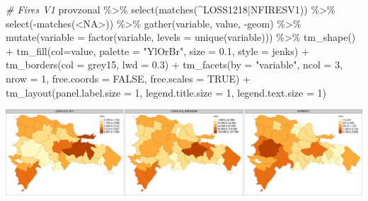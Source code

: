 \documentclass[10pt,landscape,a3paper]{article}
\newenvironment{Shaded}{\begin{snugshade}}{\end{snugshade}}
\newcommand{\AttributeTok}[1]{\textcolor[rgb]{0.77,0.63,0.00}{#1}}
\newcommand{\CommentTok}[1]{\textcolor[rgb]{0.56,0.35,0.01}{\textit{#1}}}
\newcommand{\ConstantTok}[1]{\textcolor[rgb]{0.00,0.00,0.00}{#1}}
\newcommand{\DecValTok}[1]{\textcolor[rgb]{0.00,0.00,0.81}{#1}}
\newcommand{\FloatTok}[1]{\textcolor[rgb]{0.00,0.00,0.81}{#1}}
\newcommand{\FunctionTok}[1]{\textcolor[rgb]{0.00,0.00,0.00}{#1}}
\newcommand{\NormalTok}[1]{#1}
\newcommand{\SpecialCharTok}[1]{\textcolor[rgb]{0.00,0.00,0.00}{#1}}
\newcommand{\StringTok}[1]{\textcolor[rgb]{0.31,0.60,0.02}{#1}}
\begin{document}
\begin{Shaded}
\begin{Highlighting}[]
\CommentTok{\# Fires V1}
\NormalTok{provzonal }\SpecialCharTok{\%\textgreater{}\%} \FunctionTok{select}\NormalTok{(}\FunctionTok{matches}\NormalTok{(}\StringTok{\textquotesingle{}\^{}LOSS1218|NFIRESV1\textquotesingle{}}\NormalTok{)) }\SpecialCharTok{\%\textgreater{}\%} \FunctionTok{select}\NormalTok{(}\SpecialCharTok{{-}}\FunctionTok{matches}\NormalTok{(}\StringTok{\textquotesingle{}\textless{}NA\textgreater{}\textquotesingle{}}\NormalTok{)) }\SpecialCharTok{\%\textgreater{}\%} 
  \FunctionTok{gather}\NormalTok{(variable, value, }\SpecialCharTok{{-}}\NormalTok{geom) }\SpecialCharTok{\%\textgreater{}\%}
  \FunctionTok{mutate}\NormalTok{(}\AttributeTok{variable =} \FunctionTok{factor}\NormalTok{(variable, }\AttributeTok{levels =} \FunctionTok{unique}\NormalTok{(variable))) }\SpecialCharTok{\%\textgreater{}\%} 
  \FunctionTok{tm\_shape}\NormalTok{() }\SpecialCharTok{+}
  \FunctionTok{tm\_fill}\NormalTok{(}\AttributeTok{col=}\StringTok{\textquotesingle{}value\textquotesingle{}}\NormalTok{, }\AttributeTok{palette =} \StringTok{"YlOrBr"}\NormalTok{, }\AttributeTok{size =} \FloatTok{0.1}\NormalTok{, }\AttributeTok{style =} \StringTok{\textquotesingle{}jenks\textquotesingle{}}\NormalTok{) }\SpecialCharTok{+}
  \FunctionTok{tm\_borders}\NormalTok{(}\AttributeTok{col =} \StringTok{\textquotesingle{}grey15\textquotesingle{}}\NormalTok{, }\AttributeTok{lwd =} \FloatTok{0.3}\NormalTok{) }\SpecialCharTok{+}
  \FunctionTok{tm\_facets}\NormalTok{(}\AttributeTok{by =} \StringTok{"variable"}\NormalTok{, }\AttributeTok{ncol =} \DecValTok{3}\NormalTok{, }\AttributeTok{nrow =} \DecValTok{1}\NormalTok{, }\AttributeTok{free.coords =} \ConstantTok{FALSE}\NormalTok{, }\AttributeTok{free.scales =} \ConstantTok{TRUE}\NormalTok{) }\SpecialCharTok{+}
  \FunctionTok{tm\_layout}\NormalTok{(}\AttributeTok{panel.label.size =} \DecValTok{1}\NormalTok{, }\AttributeTok{legend.title.size =} \DecValTok{1}\NormalTok{, }\AttributeTok{legend.text.size =} \DecValTok{1}\NormalTok{)}
\end{Highlighting}
\end{Shaded}

\begin{center}\includegraphics{img/zonal-prov-8} \end{center}
\end{document}
